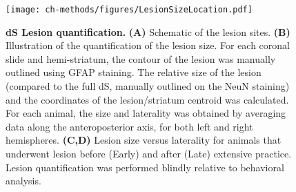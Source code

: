 \begin{figure}[bth!]
 \begin{center}
	\texttt{[image: ch-methods/figures/LesionSizeLocation.pdf]}
	\caption[]
	{\textbf{dS Lesion quantification.}
	\textbf{(A)} Schematic of the lesion sites.
	\textbf{(B)} Illustration of the quantification of the lesion size. For each coronal slide and hemi-striatum, the contour of the lesion was manually outlined using GFAP staining.
	The relative size of the lesion (compared to the full dS, manually outlined on the NeuN staining) and the coordinates of the lesion/striatum centroid was calculated.
	For each animal, the size and laterality was obtained by averaging data along the anteroposterior axis, for both left and right hemispheres.
	\textbf{(C,D)} Lesion size versus laterality for animals that underwent lesion before (Early) and after (Late) extensive practice.
	Lesion quantification was performed blindly relative to behavioral analysis.
	}
	\label{fig:method:LesionSizeLocation}
 \end{center}
\end{figure}